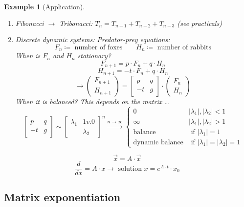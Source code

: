 \documentclass{article}
\newcounter{lecref}[section]
\numberwithin{lecref}{section}
\newtheorem{example}[lecref]{Example}
\newcommand{\card}[1]{\left|#1\right|}
\begin{document}
\begin{example}[Application]
  \begin{enumerate}
    \item Fibonacci $\to$ Tribonacci: $T_n = T_{n-1} + T_{n-2} + T_{n-3}$ (see practicals)
    \item Discrete dynamic systems: Predator-prey equations:
      \[ F_n \coloneqq \text{ number of foxes} \qquad H_n \coloneqq \text{ number of rabbits} \]
      When is $F_n$ and $H_n$ stationary?
      \[ F_{n+1} = p \cdot F_n + q \cdot H_n \]
      \[ H_{n+1} = -t \cdot F_n + q \cdot H_n \]
      \[ \to \begin{pmatrix} F_{n+1} \\ H_{n+1} \end{pmatrix} = \begin{bmatrix} p & q \\ -t & g \end{bmatrix} \cdot \begin{pmatrix} F_n \\ H_n \end{pmatrix} \]
      When it is balanced? This depends on the matrix \dots
      \[
        \begin{bmatrix} p & q \\ -t & g \end{bmatrix} \sim \begin{bmatrix} \lambda_1 & 1v.0 \\ & \lambda_2 \end{bmatrix}^n %
        \xrightarrow{n \to \infty} \begin{cases}
          0 & \card{\lambda_1}, \card{\lambda_2} < 1 \\
          \infty & \card{\lambda_1}, \card{\lambda_2} > 1 \\
          \text{balance} & \text{ if } \card{\lambda_1} = 1 \\
          \text{dynamic balance} & \text{ if } \card{\lambda_1} = \card{\lambda_2} = 1
        \end{cases}
      \]
  \end{enumerate}
  \[ \vec x = A \cdot \vec x \]
  \[ \frac{d}{dx} = A \cdot x \rightarrow \text{ solution } x = e^{A \cdot t} \cdot x_0 \]
\end{example}

\subsection{Matrix exponentiation}
\end{document}
